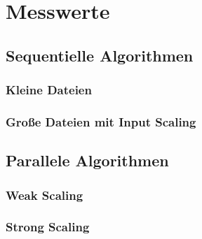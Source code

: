 \chapter{Messwerte}
\clearpage

\section{Sequentielle Algorithmen}
\subsection{Kleine Dateien}



\FloatBarrier
\subsection{Große Dateien mit Input Scaling}



\FloatBarrier

\section{Parallele Algorithmen}
\subsection{Weak Scaling}



\FloatBarrier
\subsection{Strong Scaling}



\FloatBarrier
